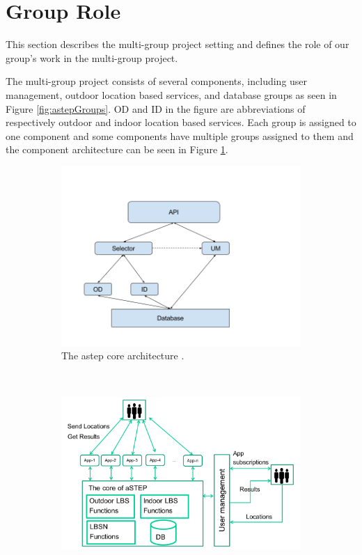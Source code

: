 \section{Group Role}\label{sec:grouprole}
This section describes the multi-group project setting and defines the role of our group’s work in the multi-group project.

The multi-group project consists of several components, including user management, outdoor location based services, and database groups as seen in Figure \ref{fig:astepGroups}.
OD and ID in the figure are abbreviations of respectively outdoor and indoor location based services.
Each group is assigned to one component and some components have multiple groups assigned to them and the component architecture can be seen in Figure \ref{fig:astepCore}.

\begin{figure}[h!]
	\centering
	\begin{subfigure}[b]{0.48\textwidth}
		\includegraphics[width=\textwidth]{figures/InformalArchitecture.png}
		\caption{The \gls{astep} core architecture \cite{astepArchitectureImage}. }
		\label{fig:astepCore}
	\end{subfigure}
	~ %
	\begin{subfigure}[b]{0.48\textwidth}
		\includegraphics[width=\textwidth]{figures/astepGroups.png}

\end{subfigure}
\end{figure}

